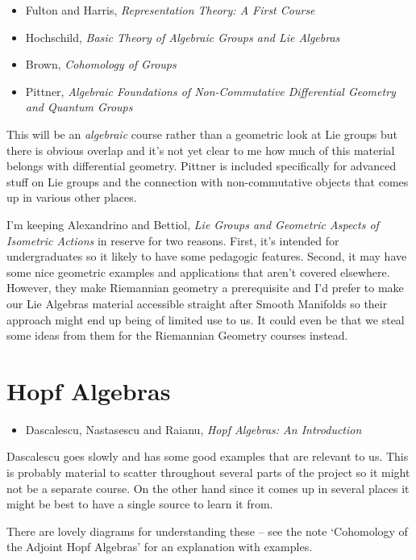\documentclass[article]{article}
\begin{document}
\begin{itemize}
	\item{Fulton and Harris, \textit{Representation Theory: A First Course}}
	\item{Hochschild, \textit{Basic Theory of Algebraic Groups and Lie Algebras}}
	\item{Brown, \textit{Cohomology of Groups}}
	\item{Pittner, \textit{Algebraic Foundations of Non-Commutative Differential Geometry and Quantum Groups}}
\end{itemize}

This will be an \textit{algebraic} course rather than a geometric look at Lie groups but there is obvious overlap and it's not yet clear to me how much of this material belongs with differential geometry. Pittner is included specifically for advanced stuff on Lie groups and the connection with non-commutative objects that comes up in various other places.

I'm keeping Alexandrino and Bettiol, \textit{Lie Groups and Geometric Aspects of Isometric Actions} in reserve for two reasons. First, it's intended for undergraduates so it likely to have some pedagogic features. Second, it may have some nice geometric examples and applications that aren't covered elsewhere. However, they make Riemannian geometry a prerequisite and I'd prefer to make our Lie Algebras material accessible straight after Smooth Manifolds so their approach might end up being of limited use to us. It could even be that we steal some ideas from them for the Riemannian Geometry courses instead.

\section{Hopf Algebras}

\begin{itemize}
	\item{Dascalescu, Nastasescu and Raianu, \textit{Hopf Algebras: An Introduction}}
\end{itemize}

Dascalescu goes slowly and has some good examples that are relevant to us. This is probably material to scatter throughout several parts of the project so it might not be a separate course. On the other hand since it comes up in several places it might be best to have a single source to learn it from.

There are lovely diagrams for understanding these -- see the note `Cohomology of the Adjoint Hopf Algebras' for an explanation with examples.
\end{document}
